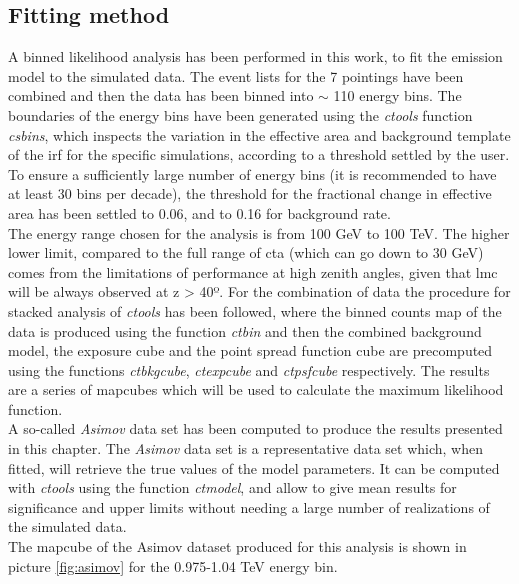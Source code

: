 \documentclass{article}
\begin{document}
\subsection{Fitting method}

A binned likelihood analysis has been performed in this work, to fit the emission model to the simulated data. The event lists for the 7 pointings have been combined and then the data has been binned into $\sim$ 110 energy bins. The boundaries of the energy bins have been generated using the \textit{ctools} function \textit{csbins}, which inspects the variation in the effective area and background template of the \gls{irf} for the specific simulations, according to a threshold settled by the user. To ensure a sufficiently large number of energy bins (it is recommended to have at least 30 bins per decade), the threshold for the fractional change in effective area has been settled to 0.06, and to 0.16 for background rate. \\
The energy range chosen for the analysis is from 100 GeV to 100 TeV. The higher lower limit, compared to the full range of \gls{cta} (which can go down to 30 GeV) comes from the limitations of performance at high zenith angles, given that \gls{lmc} will be always observed at z > 40º.
For the combination of data the procedure for stacked analysis of \textit{ctools} has been followed, where the binned counts map of the data is produced using the function \textit{ctbin} and then the combined background model, the exposure cube and the point spread function cube are precomputed using the functions \textit{ctbkgcube}, \textit{ctexpcube} and \textit{ctpsfcube} respectively. The results are a series of mapcubes which will be used to calculate the maximum likelihood function.\\
A so-called \textit{Asimov} data set has been computed to produce the results presented in this chapter. The \textit{Asimov} data set \cite{2011Asimov} is a representative data set which, when fitted, will retrieve the true values of the model parameters. It can be computed with \textit{ctools} using the function \textit{ctmodel}, and allow to give mean results for significance and upper limits without needing a large number of realizations of the simulated data.\\
The mapcube of the Asimov dataset produced for this analysis is shown in picture \ref{fig:asimov} for the 0.975-1.04 TeV energy bin. 
\end{document}
